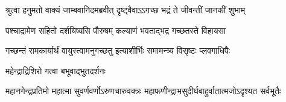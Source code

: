 \twolineshloka
{श्रुत्वा हनुमतो वाक्यं जाम्बवानिदमब्रवीत्}
{दृष्ट्वैवाऽऽगच्छ भद्रं ते जीवन्तीं जानकीं शुभाम्} %

\twolineshloka
{पश्चाद्रामेण सहितो दर्शयिष्यसि पौरुषम्}
{कल्याणं भवताद्भद्र गच्छतस्ते विहायसा} %

\twolineshloka
{गच्छन्तं रामकार्यार्थं वायुस्त्वामनुगच्छतु}
{इत्याशीर्भिः समामन्त्र्य विसृष्टः प्लवगाधिपैः} %

\onelineshloka
{महेन्द्राद्रिशिरो गत्वा बभूवाद्भुतदर्शनः} %

\twolineshloka
{महानगेन्द्रप्रतिमो महात्मा सुवर्णवर्णोऽरुणचारुवक्त्रः}
{महाफणीन्द्राभसुदीर्घबाहुर्वातात्मजोऽदृश्यत सर्वभूतैः} %


